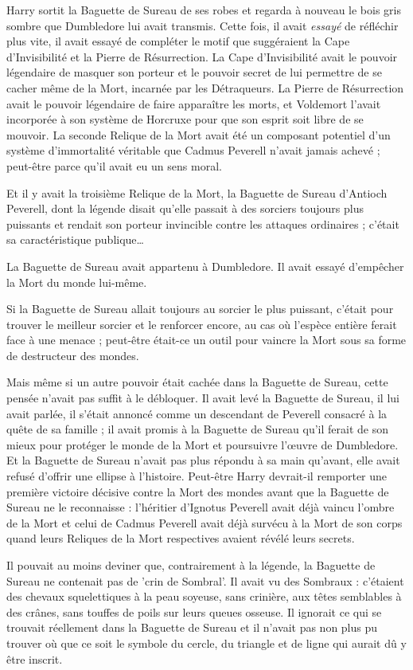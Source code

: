 Harry sortit la Baguette de Sureau de ses robes et regarda à nouveau le bois gris sombre que Dumbledore lui avait transmis. Cette fois, il avait \emph{essayé}  de réfléchir plus vite, il avait essayé de compléter le motif que suggéraient la Cape d'Invisibilité et la Pierre de Résurrection. La Cape d'Invisibilité avait le pouvoir légendaire de masquer son porteur et le pouvoir secret de lui permettre de se cacher même de la Mort, incarnée par les Détraqueurs. La Pierre de Résurrection avait le pouvoir légendaire de faire apparaître les morts, et Voldemort l'avait incorporée à son système de Horcruxe pour que son esprit soit libre de se mouvoir. La seconde Relique de la Mort avait été un composant potentiel d'un système d'immortalité véritable que Cadmus Peverell n'avait jamais achevé ; peut-être parce qu'il avait eu un sens moral.

Et il y avait la troisième Relique de la Mort, la Baguette de Sureau d'Antioch Peverell, dont la légende disait qu'elle passait à des sorciers toujours plus puissants et rendait son porteur invincible contre les attaques ordinaires ; c'était sa caractéristique publique…

La Baguette de Sureau avait appartenu à Dumbledore. Il avait essayé d'empêcher la Mort du monde lui-même.

Si la Baguette de Sureau allait toujours au sorcier le plus puissant, c'était pour trouver le meilleur sorcier et le renforcer encore, au cas où l'espèce entière ferait face à une menace ; peut-être était-ce un outil pour vaincre la Mort sous sa forme de destructeur des mondes.

Mais même si un autre pouvoir était cachée dans la Baguette de Sureau, cette pensée n'avait pas suffit à le débloquer. Il avait levé la Baguette de Sureau, il lui avait parlée, il s'était annoncé comme un descendant de Peverell consacré à la quête de sa famille ; il avait promis à la Baguette de Sureau qu'il ferait de son mieux pour protéger le monde de la Mort et poursuivre l'œuvre de Dumbledore. Et la Baguette de Sureau n'avait pas plus répondu à sa main qu'avant, elle avait refusé d'offrir une ellipse à l'histoire. Peut-être Harry devrait-il remporter une première victoire décisive contre la Mort des mondes avant que la Baguette de Sureau ne le reconnaisse : l'héritier d'Ignotus Peverell avait déjà vaincu l'ombre de la Mort et celui de Cadmus Peverell avait déjà survécu à la Mort de son corps quand leurs Reliques de la Mort respectives avaient révélé leurs secrets.

Il pouvait au moins deviner que, contrairement à la légende, la Baguette de Sureau ne contenait pas de 'crin de Sombral'. Il avait vu des Sombraux : c'étaient des chevaux squelettiques à la peau soyeuse, sans crinière, aux têtes semblables à des crânes, sans touffes de poils sur leurs queues osseuse. Il ignorait ce qui se trouvait réellement dans la Baguette de Sureau et il n'avait pas non plus pu trouver où que ce soit le symbole du cercle, du triangle et de ligne qui aurait dû y être inscrit.

